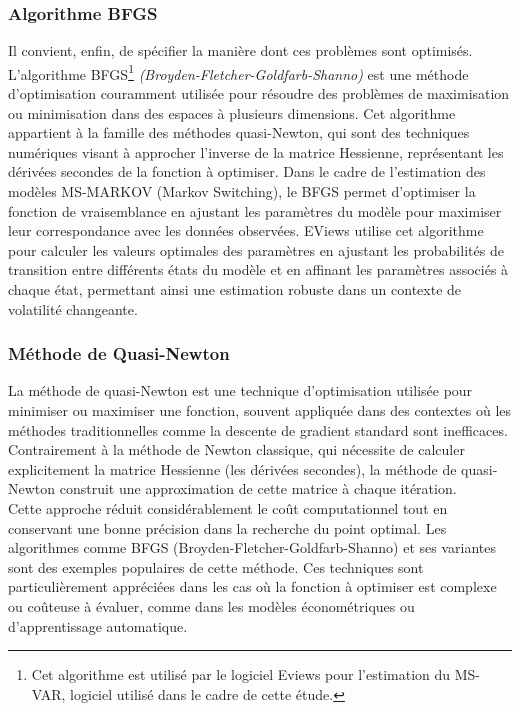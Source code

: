 \begin{sloppypar}
\subsubsection{Algorithme BFGS}

Il convient, enfin, de spécifier la manière dont ces problèmes sont optimisés. L'algorithme BFGS\footnote{Cet algorithme est utilisé par le logiciel Eviews pour l'estimation du MS-VAR, logiciel utilisé dans le cadre de cette étude.} \textit{(Broyden-Fletcher-Goldfarb-Shanno)} est une méthode d'optimisation 
couramment utilisée pour résoudre des problèmes de maximisation ou minimisation dans des espaces à plusieurs dimensions. 
Cet algorithme appartient à la famille des méthodes quasi-Newton, qui sont des techniques numériques visant à approcher 
l'inverse de la matrice Hessienne, représentant les dérivées secondes de la fonction à optimiser.  Dans le cadre de l'estimation des modèles MS-MARKOV (Markov Switching), le BFGS permet d'optimiser la fonction de vraisemblance en ajustant les paramètres du modèle pour maximiser leur correspondance avec les données observées. EViews utilise cet algorithme pour calculer les valeurs optimales des paramètres en ajustant les probabilités de transition entre différents états du modèle et en affinant les paramètres associés à chaque état, permettant ainsi une estimation robuste dans un contexte de volatilité changeante.

\subsubsection{Méthode de Quasi-Newton}

La méthode de quasi-Newton est une technique d'optimisation utilisée pour minimiser ou maximiser une fonction, souvent appliquée dans des contextes où les méthodes traditionnelles comme la descente de gradient standard sont inefficaces. Contrairement à la méthode de Newton classique, qui nécessite de calculer explicitement la matrice Hessienne (les dérivées secondes), la méthode de quasi-Newton construit une approximation de cette matrice à chaque itération.\\

Cette approche réduit considérablement le coût computationnel tout en conservant une bonne précision dans la recherche du point optimal. Les algorithmes comme BFGS (Broyden-Fletcher-Goldfarb-Shanno) et ses variantes sont des exemples populaires de cette méthode. Ces techniques sont particulièrement appréciées dans les cas où la fonction à optimiser est complexe ou coûteuse à évaluer, comme dans les modèles économétriques ou d'apprentissage automatique.


\end{sloppypar}
